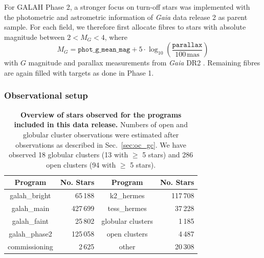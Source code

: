 \documentclass[
  journal=pasa,
  manuscript=research-paper, %
  year=2023,
  volume=37
]{cup-journal}
\newcommand{\Gaia}{\textit{Gaia}\xspace}
\begin{document}
For GALAH Phase 2, a stronger focus on turn-off stars was implemented with the photometric and astrometric information of \Gaia data release 2 as parent sample. For each field, we therefore first allocate fibres to stars with absolute magnitude between $2 < M_G < 4$, where
\begin{equation}
M_G = \texttt{phot\_g\_mean\_mag} + 5 \cdot \log_{10} \left( \frac{\texttt{parallax}}{100\,\mathrm{mas}} \right)
\end{equation}
with $G$ magnitude and parallax measurements from \Gaia DR2 \citep{Brown2018, Evans2018, Lindegren2018}. Remaining fibres are again filled with targets as done in Phase 1.

\subsubsection{Observational setup}

\begin{table}
\centering
 \caption{\textbf{Overview of stars observed for the programs included in this data release.} Numbers of open and globular cluster observations were estimated after observations as described in Sec.~\ref{sec:oc_gc}. We have observed 18 globular clusters (13 with $\geq$ 5 stars) and 286 open clusters (94 with $\geq$ 5 stars).}
\label{tab:field_ids}
\begin{tabular}{crcr}
\hline \hline
Program & No. Stars & Program & No. Stars \\
\hline
galah\_bright & 65\,188 & 
k2\_hermes & 117\,708\\
galah\_main & 427\,699 & 
tess\_hermes & 37\,228\\
galah\_faint & 25\,802 & 
globular clusters & 1\,185\\
galah\_phase2 & 125\,058 & 
open clusters & 4\,487\\
commissioning & 2\,625 & 
other & 20\,308\\
  \hline
 \end{tabular}
\end{table}
\end{document}
